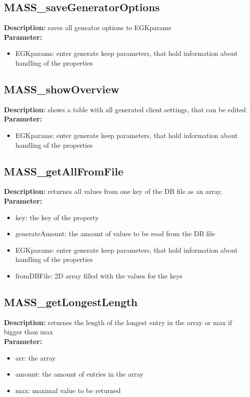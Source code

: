 \subsection{MASS\_saveGeneratorOptions}
\textbf{Description:} saves all geneator options to EGKparams\\
\textbf{Parameter:}
\begin{itemize}
\item EGKparams: enter generate keep parameters, that hold information about handling of the properties
\end{itemize}

\subsection{MASS\_showOverview}
\textbf{Description:} shows a table with all generated client settings, that can be edited\\
\textbf{Parameter:}
\begin{itemize}
\item EGKparams: enter generate keep parameters, that hold information about handling of the properties
\end{itemize}

\subsection{MASS\_getAllFromFile}
\textbf{Description:} returnes all values from one key of the DB file as an array.\\
\textbf{Parameter:}
\begin{itemize}
\item key: the key of the property
\item generateAmount: the amount of values to be read from the DB file
\item EGKparams: enter generate keep parameters, that hold information about handling of the properties
\item fromDBFile: 2D array filled with the values for the keys
\end{itemize}

\subsection{MASS\_getLongestLength}
\textbf{Description:} returnes the length of the longest entry in the array or max if bigger than max\\
\textbf{Parameter:}
\begin{itemize}
\item arr: the array
\item amount: the amount of entries in the array
\item max: maximal value to be returned
\end{itemize}

